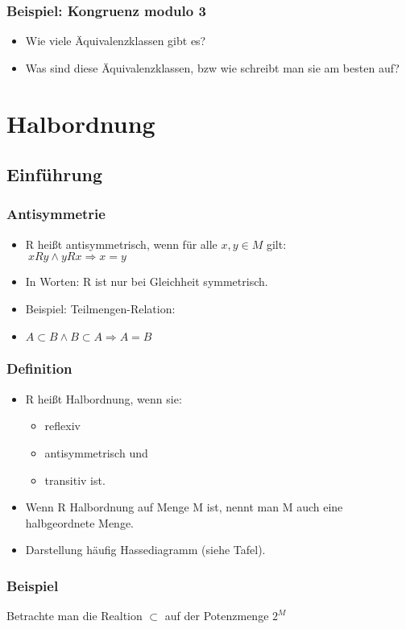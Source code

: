\documentclass{beamer}
\begin{document}
\begin{frame}
	\frametitle{Beispiel: Kongruenz modulo 3}
	\begin{itemize}
		\item Wie viele Äquivalenzklassen gibt es?
		\item Was sind diese Äquivalenzklassen, bzw wie schreibt man sie am besten auf?
	\end{itemize}
\end{frame}

\section{Halbordnung}
\subsection{Einführung}
\begin{frame}
	\frametitle{Antisymmetrie}
	\begin{itemize}
		\item R heißt antisymmetrisch, wenn für alle $x,y \in M$ gilt:\\
		$\> xRy \land yRx \Rightarrow x = y$
		\pause
		\item In Worten: R ist nur bei Gleichheit symmetrisch.
		\item Beispiel: Teilmengen-Relation:
		\item $A \subset B \land B \subset A \Rightarrow A = B$
	\end{itemize}
\end{frame}

\begin{frame}
	\frametitle{Definition}
	\begin{itemize}
		\item R heißt Halbordnung, wenn sie:\\
			\begin{itemize}
				\item reflexiv
				\item antisymmetrisch und
				\item transitiv ist.
			\end{itemize}
		\item Wenn R Halbordnung auf Menge M ist, nennt man M auch eine halbgeordnete Menge.	
		\item Darstellung häufig Hassediagramm (siehe Tafel).
	\end{itemize}
\end{frame}

\begin{frame}
	\frametitle{Beispiel}
	 Betrachte man die Realtion $\subset$ auf der Potenzmenge $2^M$ 
\end{frame}
\end{document}
